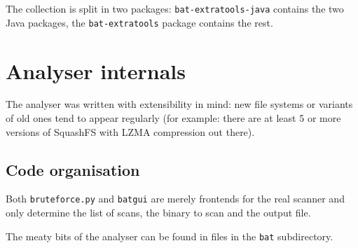 \documentclass[10pt]{article}
\begin{document}
The collection is split in two packages: \texttt{bat-extratools-java} contains
the two Java packages, the \texttt{bat-extratools} package contains the rest.

\appendix

\section{Analyser internals}

The analyser was written with extensibility in mind: new file systems or
variants of old ones tend to appear regularly (for example: there are at
least 5 or more versions of SquashFS with LZMA compression out there).

\subsection{Code organisation}

Both \texttt{bruteforce.py} and \texttt{batgui} are merely frontends for the
real scanner and only determine the list of scans, the binary to scan and the
output file.

The meaty bits of the analyser can be found in files in the \texttt{bat}
subdirectory.
\end{document}
